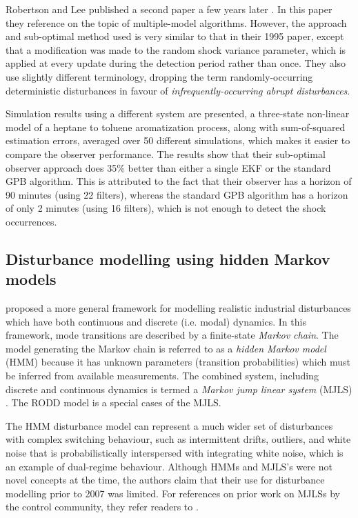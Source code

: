 Robertson and Lee published a second paper a few years later \citep{robertson_method_1998}. In this paper they reference \cite{andersson_adaptive_1985} on the topic of multiple-model algorithms.  However, the approach and sub-optimal method used is very similar to that in their 1995 paper, except that a modification was made to the random shock variance parameter, which is applied at every update during the detection period rather than once. They also use slightly different terminology, dropping the term randomly-occurring deterministic disturbances in favour of \textit{infrequently-occurring abrupt disturbances}.

Simulation results using a different system are presented, a three-state non-linear model of a heptane to toluene aromatization process, along with sum-of-squared estimation errors, averaged over 50 different simulations, which makes it easier to compare the observer performance. The results show that their sub-optimal observer approach does 35\% better than either a single EKF or the standard GPB algorithm. This is attributed to the fact that their observer has a horizon of 90 minutes (using 22 filters), whereas the standard GPB algorithm has a horizon of only 2 minutes (using 16 filters), which is not enough to detect the shock occurrences.

\subsection{Disturbance modelling using hidden Markov models}
\label{hidden_markov_models}

\cite{wong_disturbance_2007} proposed a more general framework for modelling realistic industrial disturbances which have both continuous and discrete (i.e. modal) dynamics. In this framework, mode transitions are described by a finite-state \textit{Markov chain}. The model generating the Markov chain is referred to as a \textit{hidden Markov model} (HMM) because it has unknown parameters (transition probabilities) which must be inferred from available measurements. The combined system, including discrete and continuous dynamics is termed a \textit{Markov jump linear system} (MJLS) \citep{costa_discrete-time_2005}. The RODD model is a special cases of the MJLS.


The HMM disturbance model can represent a much wider set of disturbances with complex switching behaviour, such as intermittent drifts, outliers, and white noise that is probabilistically interspersed with integrating white noise, which is an example of dual-regime behaviour. Although HMMs and MJLS's were not novel concepts at the time, the authors claim that their use for disturbance modelling prior to 2007 was limited. For references on prior work on MJLSs by the control community, they refer readers to \cite{costa_discrete-time_2005}.

